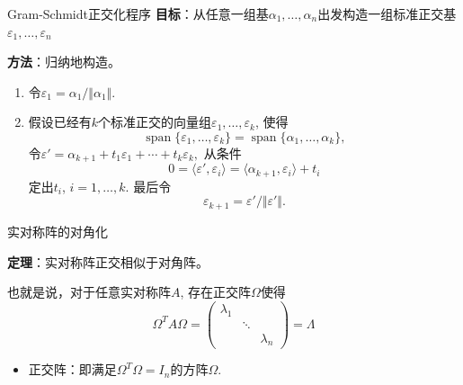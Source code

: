 \documentclass[10pt]{beamer}
\begin{document}

\begin{frame}

\begin{block}{Gram-Schmidt正交化程序}
{\bfseries 目标}：从任意一组基$\alpha_1, \ldots, \alpha_n$出发构造一组标准正交基$\varepsilon_1, \ldots, \varepsilon_n$

\vspace{1em}
\pause

{\bfseries 方法}：归纳地构造。
\begin{enumerate}
\item 令$\varepsilon_1 = \alpha_1 / \Vert \alpha_1 \Vert$.
\item 假设已经有$k$个标准正交的向量组$\varepsilon_1, \ldots, \varepsilon_k$, 使得
$$\operatorname{span}\{ \varepsilon_1, \ldots, \varepsilon_k \} = \operatorname{span}\{ \alpha_1, \ldots, \alpha_k \},$$
令$\varepsilon' = \alpha_{k+1} + t_1\varepsilon_1 + \cdots + t_k\varepsilon_k,$ 从条件
$$0 = \langle \varepsilon', \varepsilon_i \rangle = \langle \alpha_{k+1}, \varepsilon_i \rangle + t_i$$
定出$t_i$, $i=1,\ldots,k$. 最后令
$$\varepsilon_{k+1} = \varepsilon' / \Vert \varepsilon' \Vert.$$
\end{enumerate}
\end{block}

\end{frame}


\begin{frame}

\begin{block}{实对称阵的对角化}

\vspace{1em}

{\bfseries 定理}：实对称阵正交相似于对角阵。

\vspace{1em}

也就是说，对于任意实对称阵$A$, 存在正交阵$\Omega$使得
$$\Omega^T A \Omega = \begin{pmatrix} \lambda_1 & & \\ & \ddots & \\ & & \lambda_n \end{pmatrix} = \Lambda$$

\begin{itemize}
\item 正交阵：即满足$\Omega^T\Omega = I_n$的方阵$\Omega$.
\end{itemize}
\end{block}

\end{frame}
\end{document}
